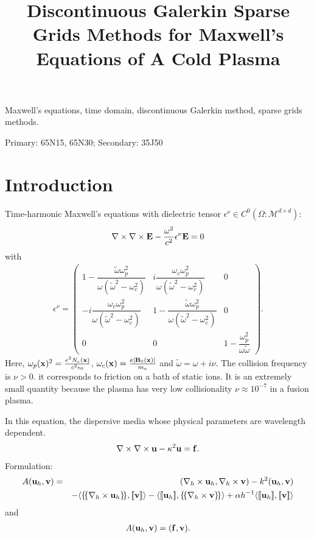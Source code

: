 \documentclass[final,leqno]{siamltex704}
\title{Discontinuous Galerkin Sparse Grids Methods for Maxwell's Equations of A Cold Plasma}
\author{
}
\newcommand{\bv}{{\bf v}}
\def\bbf{{\bf f}}
\def\bu{{\bf u}}
\def\bv{{\bf v}}
\def\bE{{\bf E}}
\def\ljump{{[\![}}
\def\rjump{{]\!]}}
\def\lavg{{\{\!\{}}
\def\ravg{{\}\!\}}}
\begin{document}
\maketitle

\begin{abstract}
\end{abstract}

\begin{keywords}
Maxwell's equations, time domain, discontinuous Galerkin method, sparse grids methods.
\end{keywords}

\begin{AMS}
Primary: 65N15, 65N30; Secondary: 35J50
\end{AMS}
\pagestyle{myheadings}

\section{Introduction}
Time-harmonic Maxwell's equations with dielectric tensor $\epsilon^{\nu}\in C^0(\Omega : \mathcal{M}^{d\times d})$:
\begin{eqnarray}
\nabla\times\nabla\times{\bE}-\frac{\omega^2}{c^2}\epsilon^{\nu}\bE = 0
\end{eqnarray}
with
\begin{eqnarray*}
\epsilon^{\nu}=\begin{pmatrix}
1-\dfrac{\tilde{\omega}\omega_p^2}{\omega(\tilde{\omega}^2-\omega_c^2)}  & i\dfrac{\omega_c\omega_p^2}{\omega(\tilde{\omega}^2-\omega_c^2)} & 0\\
-i\dfrac{\omega_c\omega_p^2}{\omega(\tilde{\omega}^2-\omega_c^2)}& 1-\dfrac{\tilde{\omega}\omega_p^2}{\omega(\tilde{\omega}^2-\omega_c^2)} & 0\\
0 & 0 & 1-\dfrac{\omega_p^2}{\omega\tilde{\omega}}
\end{pmatrix}.
\end{eqnarray*}
Here, $\omega_p({\bf x})^2=\frac{e^2N_e({\bf x})}{c^2\epsilon_0}$, $\omega_c({\bf x})=\frac{e|{\bf B}_0({\bf x})|}{m_e}$ and $\tilde{\omega}=\omega+i\nu.$ The collision frequency is $\nu>0$. it corresponds to friction on a bath of static ions. It is an extremely small quantity because the plasma has very low collisionality $\nu\approx 10^{-7}$ in a fusion plasma.

In this equation, the dispersive media whose physical parameters are wavelength dependent.
\begin{eqnarray}
\nabla\times\nabla\times\bu-\kappa^2\bu =\bbf.
\end{eqnarray}
Formulation:
\begin{eqnarray}
A(\bu_h,\bv)&=&(\nabla_h\times \bu_h,\nabla_h\times \bv)-k^2(\bu_h,\bv)\notag\\
&&-\langle\lavg\nabla_h\times \bu_h\ravg,\ljump \bv\rjump\rangle-\langle\ljump \bu_h\rjump,\lavg\nabla_h\times \bv\ravg\rangle
+\alpha h^{-1}\langle\ljump \bu_h\rjump,\ljump \bv\rjump\rangle
\end{eqnarray}
and
\begin{eqnarray}
A(\bu_h,\bv)=(\bbf,\bv).
\end{eqnarray}
\end{document}
